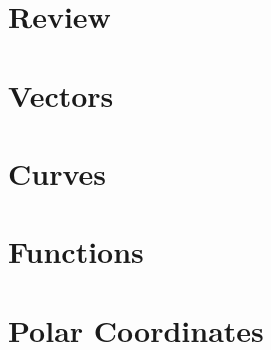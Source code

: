 \documentclass[letterpaper,oneside]{book}%
\newcommand{\wrapup}{
\bmw{\section{Wrap Up}
Once you have finished the problems in the section and feel comfortable with the ideas, create a short one page lesson plan that contains examples of the key ideas.  You will get a chance to teach from this lesson plan prior to taking the exam. Then log on to Brainhoney and download the quiz. Once you have taken the quiz, you can upload your work back to brainhoney and then download the key to see how you did. If you still need to work on mastering some of the ideas, please do so and then demonstrate your mastery though the quiz corrections.}
}
\newcommand{\bmw}[1]{}
\theoremstyle{plain}
\theoremstyle{box}
\theoremstyle{problem}
\begin{document}
\bmw{\chapter*{Introduction}
This course may be like no other course in mathematics you have ever taken.  We'll discuss in class some of the key differences, and eventually this section will contain a complete description of how this course works. For now, it's just a skeleton.

I received the following email about 6 months after a student took the course:

\begin{quote}
Hey Brother Woodruff,

I was reading {\it Knowledge of Spiritual Things} by Elder Scott.
I thought the following quote would be awesome to share with your
students, especially those in Math 215 :)

\begin{quote}
Profound [spiritual] truth cannot simply be poured
from one mind and heart to another. It takes faith
and diligent effort. Precious truth comes a small
piece at a time through faith, with great exertion,
and at times wrenching struggles.
\end{quote}
\end{quote}
Elder Scott's words perfectly describe how we acquire mathematical truth, as well as spiritual truth. 
}
\tableofcontents

\mainmatter

\chapter{Review}

\wrapup


\chapter{Vectors}

\wrapup

\chapter{Curves}

\wrapup
\chapter{Functions}

\wrapup


\chapter{Polar Coordinates}

\wrapup
\end{document}
